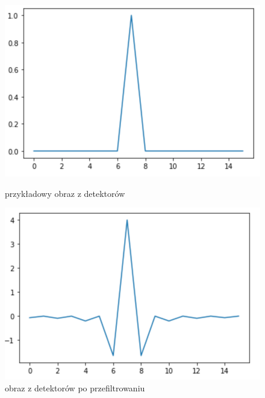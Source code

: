 \documentclass[polish,polish,a4paper]{article}
\begin{document}
					
					\begin{figure}[!h]
						\centering
						\begin{minipage}{0.45\linewidth}
							\includegraphics[width=\linewidth]{img/filtr_1.png}
							\caption{przykładowy obraz z detektorów}
						\end{minipage}
						\hfill
						\begin{minipage}{0.45\linewidth}
							\includegraphics[width=\linewidth]{img/filtr_2.png}
							\caption{obraz z detektorów po przefiltrowaniu}
						\end{minipage}
					\end{figure}
			
			\newpage
\end{document}
